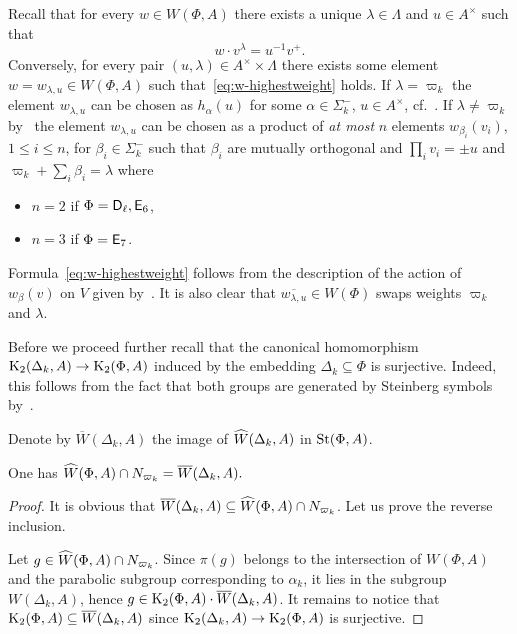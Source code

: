 Recall that for every $w \in W(\Phi, A)$ there exists a unique $\lambda \in \Lambda$ and $u \in A^\times $ such that
 \begin{equation}\label{eq:w-highestweight} w \cdot v^\lambda = u^{-1} v^+. \end{equation}
Conversely, for every pair $(u, \lambda) \in A^\times \times \Lambda$ there exists some element $w = w_{\lambda, u} \in W(\Phi, A)$ such that~\eqref{eq:w-highestweight} holds.
    If $\lambda = \varpi_k$ the element $w_{\lambda, u}$ can be chosen as $h_\alpha(u)$ for some $\alpha \in \Sigma_k^-$, $u \in A^\times$, cf.~\cite[Lemma~7]{V00}.
    If $\lambda \neq \varpi_k$ by~\cite[Lemma~6]{V00} the element $w_{\lambda, u}$ can be chosen as a product of \textit{at most} $n$ elements
     $w_{\beta_i}(v_i)$, $1 \leq i \leq n$, for $\beta_i\in\Sigma_k^-$ such that $\beta_i$ are mutually orthogonal and $\prod_i v_i = \pm u$ and $\varpi_k + \sum_i \beta_i = \lambda$ where
    \begin{itemize}
        \item $n=2$ if $\Phi = \mathsf{D}_\ell, \mathsf{E}_6$,
        \item $n=3$ if $\Phi = \mathsf{E}_7$.
    \end{itemize}
    Formula~\eqref{eq:w-highestweight} follows from the description of the action of $w_\beta(v)$ on $V$ given by~\cite[Lemma~6]{V00}.
    It is also clear that $\overline{w_{\lambda, u}} \in W(\Phi)$ swaps weights $\varpi_k$ and $\lambda$.

Before we proceed further recall that the canonical homomorphism
 $\operatorname{K}_2(\Delta_k, A) \to \operatorname{K}_2(\Phi, A)$ induced by the embedding $\Delta_k \subseteq \Phi$ is surjective.
Indeed, this follows from the fact that both groups are generated by Steinberg symbols by~\cite[Theorem~2.5]{Ste73}.

Denote by $\overline{W}(\Delta_k, A)$ the image of $\widehat{W}(\Delta_k, A)$ in $\operatorname{St}(\Phi, A)$.
\begin{lemma} \label{lem:can-repr1}
One has $\widehat{W}(\Phi, A) \cap N_{\varpi_k} = \overline{W}(\Delta_k, A).$
\end{lemma}
\begin{proof}
    It is obvious that $\overline{W}(\Delta_k, A) \subseteq \widehat{W}(\Phi, A) \cap N_{\varpi_k}$.
    Let us prove the reverse inclusion.

    Let $g \in \widehat{W}(\Phi, A) \cap N_{\varpi_k}$.
    Since $\pi(g)$ belongs to the intersection of $W(\Phi, A)$ and the parabolic subgroup corresponding to $\alpha_k$,
     it lies in the subgroup $W(\Delta_k, A)$, hence $g \in \operatorname{K}_2(\Phi, A)\cdot \overline{W}(\Delta_k, A)$.
    It remains to notice that $\operatorname{K}_2(\Phi, A) \subseteq \overline{W}(\Delta_k, A)$ since $\operatorname{K}_2(\Delta_k, A) \to \operatorname{K}_2(\Phi, A)$ is surjective.
\end{proof}

